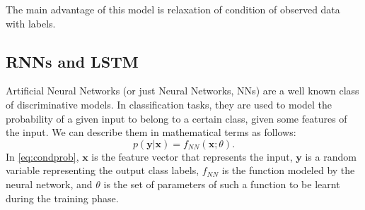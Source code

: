 The main advantage of this model is relaxation of condition of observed data with labels. 




\subsection{RNNs and LSTM}
Artificial Neural Networks (or just Neural Networks, NNs) are a well
known class of discriminative models. In classification tasks, they are
used to model the probability of a given input to belong to a certain
class, given some features of the input. We can describe them in
mathematical terms as follows:
%
\begin{equation}
  \label{eq:condprob}
  p(\mathbf{y}|\mathbf{x}) = f_{\mathit{NN}}(\mathbf{x}; \theta).
\end{equation}
%
In \eqref{eq:condprob}, $\mathbf{x}$ is the feature vector that represents the input,
$\mathbf{y}$ is a random variable representing the output class
labels, $f_{\mathit{NN}}$ is the function modeled by the neural network, and
$\theta$ is the set of parameters of such a function to be learnt during
the training phase.


